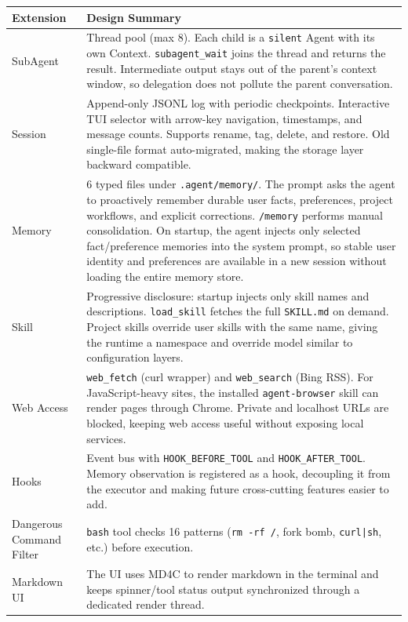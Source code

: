 \documentclass[11pt,a4paper]{article}
\begin{document}
\begin{center}
\small
\begin{tabularx}{\textwidth}{l X}
\toprule
\textbf{Extension} & \textbf{Design Summary} \\
\midrule
SubAgent &
  Thread pool (max 8). Each child is a \texttt{silent} Agent with its own
  Context. \texttt{subagent\_wait} joins the thread and returns the result.
  Intermediate output stays out of the parent's context window, so delegation
  does not pollute the parent conversation. \\[4pt]
Session &
  Append-only JSONL log with periodic checkpoints. Interactive TUI selector
  with arrow-key navigation, timestamps, and message counts. Supports
  rename, tag, delete, and restore. Old single-file format auto-migrated,
  making the storage layer backward compatible. \\[4pt]
Memory &
  6 typed files under \texttt{.agent/memory/}. The prompt asks the agent to
  proactively remember durable user facts, preferences, project workflows, and
  explicit corrections. \texttt{/memory} performs manual consolidation. On
  startup, the agent injects only selected fact/preference memories into the
  system prompt, so stable user identity and preferences are available in a new
  session without loading the entire memory store. \\[4pt]
Skill &
  Progressive disclosure: startup injects only skill names and descriptions.
  \texttt{load\_skill} fetches the full \texttt{SKILL.md} on demand. Project
  skills override user skills with the same name, giving the runtime a
  namespace and override model similar to configuration layers. \\[4pt]
Web Access &
  \texttt{web\_fetch} (curl wrapper) and \texttt{web\_search} (Bing RSS).
  For JavaScript-heavy sites, the installed \texttt{agent-browser} skill can
  render pages through Chrome. Private and localhost URLs are blocked, keeping
  web access useful without exposing local services. \\[4pt]
Hooks &
  Event bus with \texttt{HOOK\_BEFORE\_TOOL} and \texttt{HOOK\_AFTER\_TOOL}.
  Memory observation is registered as a hook, decoupling it from the
  executor and making future cross-cutting features easier to add. \\[4pt]
Dangerous Command Filter &
  \texttt{bash} tool checks 16 patterns (\texttt{rm -rf /}, fork bomb,
  \texttt{curl|sh}, etc.) before execution. \\[4pt]
Markdown UI\footnotemark &
  The UI uses MD4C to render markdown in the terminal and keeps spinner/tool
  status output synchronized through a dedicated render thread. \\
\bottomrule
\end{tabularx}
\end{center}
\end{document}
